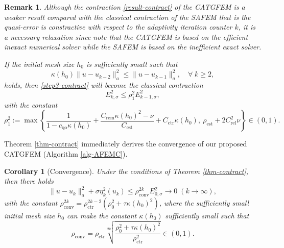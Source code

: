 \documentclass[preprint,times]{elsarticle}%
\newtheorem{remark}{Remark}[section]
\newtheorem{corollary}{Corollary}[section]
\numberwithin{algorithm}{section}
\numberwithin{equation}{section}
\newcommand{\rel}{\mathrm{rel}}
\newcommand{\est}{\mathrm{est}}
\newcommand{\rem}{\mathrm{rem}}
\newcommand{\ctr}{\mathrm{ctr}}
\newcommand{\conv}{\mathrm{conv}}
\newcommand{\qoo}{\mathrm{qo}}
\newcommand{\anorm}[1]{\|#1\|_a}
\def\leq{\leqslant}
\def\geq{\geqslant}
\begin{document}
\begin{remark} Although the contraction \eqref{result-contract} of the CATGFEM is a weaker result compared with the classical contraction of the SAFEM that is the quasi-error is constractive with respect to the adaptivity iteration counter $k$, it is a necessary relaxation since note that the CATGFEM is based on the efficient inexact numerical solver while the SAFEM is based on the inefficient exact solver. 

If the initial mesh size $h_0$ is sufficiently small such that 
	\begin{equation}
		\kappa(h_0)\anorm{u-u_{k-2}}^2 \leq \anorm{u-u_{k-1}}^2, \quad \forall \; k \geq 2, 
	\end{equation}
holds, then \eqref{step3-contract} will become the classical contraction 
	\begin{equation}\label{result-convergence}
		E_{k,\sigma}^2 \leq \rho_1^2 E_{k-1,\sigma}^2, 
	\end{equation}
with the constant 
	\begin{equation*}
		\rho_1^2 := \max\left\{\dfrac{1}{1-c_\qoo \kappa(h_0)} + \dfrac{C_\rem \kappa(h_0)^2 - \nu}{C_\est} + C_\ctr \kappa(h_0),~\rho_\est + 2C_\rel^2 \nu\right\} \in (0,1).
	\end{equation*}
\end{remark}
Theorem \ref{thm-contract} immediately derives the convergence of our proposed CATGFEM (Algorithm \ref{alg-AFEMC}).
	\begin{corollary}[Convergence]\label{cor-convergence}
		Under the conditions of Theorem \ref{thm-contract}, then there holds 
		\begin{equation*}
			\anorm{u-u_k}^2 + \sigma\eta_k^2(u_k) \leq \rho_\conv^{2k}E_{0,\sigma}^2\rightarrow 0 \;(k \rightarrow \infty), 
		\end{equation*}
	with the constant $\rho_\conv^{2k} = \rho_\ctr^{2k-2}\left(\rho_0^2 + \tau \kappa(h_0)^2\right)$, where the sufficiently small initial mesh size $h_0$ can make the constant $\kappa(h_0)$ sufficiently small such that 
	\begin{equation*}
		\rho_\conv = \rho_\ctr\sqrt[2k]{\frac{\rho_0^2+\tau \kappa(h_0)^2}{\rho_\ctr^2}} \in (0,1). 
	\end{equation*} 
	\end{corollary}
\end{document}
